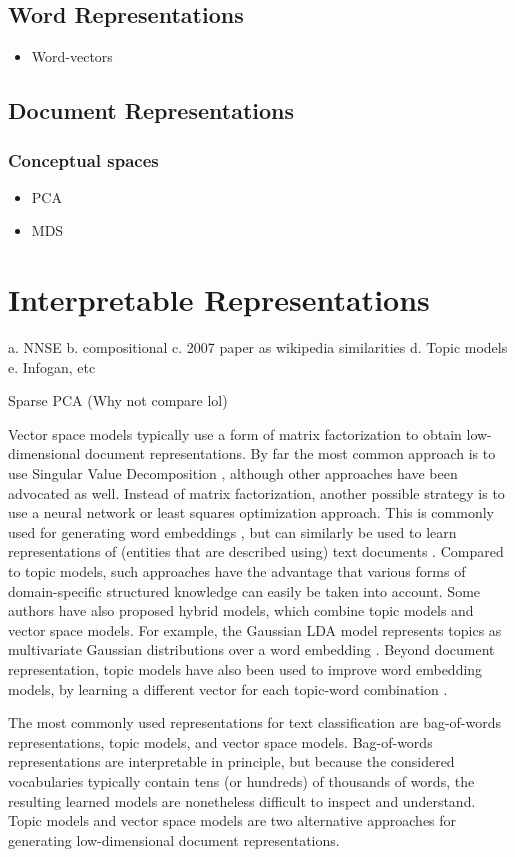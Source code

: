 \subsection{Word Representations}
\begin{itemize}
	\item Word-vectors
\end{itemize}
\subsection{Document Representations}
\subsubsection{Conceptual spaces}
\begin{itemize}
	\item PCA %
	\item MDS
\end{itemize}
\section{Interpretable Representations}
a. NNSE
b. compositional
c. 2007 paper as wikipedia similarities
d. Topic models
e. Infogan, etc

\cite{Zhang2012} Sparse PCA (Why not compare lol)

Vector space models typically use a form of matrix factorization to obtain low-dimensional document representations. By far the most common approach is to use Singular Value Decomposition \cite{ASI:ASI1}, although other approaches have been advocated as well. 
Instead of matrix factorization, another possible strategy is to use a neural network or least squares optimization approach. This is commonly used for generating word embeddings \cite{DBLP:conf/nips/MikolovSCCD13,glove2014}, but can similarly be used to learn representations of (entities that are described using) text documents \cite{DBLP:journals/corr/DaiOL15,van2016learning,DBLP:conf/sigir/JameelBS17}. Compared to topic models, such approaches have the advantage that various forms of domain-specific structured knowledge can easily be taken into account. Some authors have also proposed hybrid models, which combine topic models and vector space models. For example, the Gaussian LDA model represents topics as multivariate Gaussian distributions over a word embedding \cite{DBLP:conf/acl/DasZD15}. Beyond document representation, topic models have also been used to improve word embedding models, by learning a different vector for each topic-word combination \cite{DBLP:conf/aaai/LiuLCS15}. %

The most commonly used representations for text classification are bag-of-words representations, topic models, and vector space models. Bag-of-words representations are interpretable in principle, but because the considered vocabularies typically contain tens (or hundreds) of thousands of words, the resulting learned models are nonetheless difficult to inspect and understand. Topic models and vector space models are two alternative approaches for generating low-dimensional document representations. %


